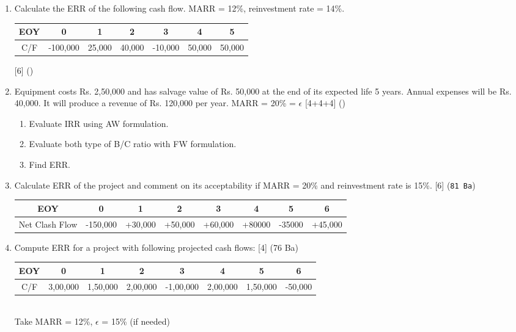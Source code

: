 \documentclass[12pt]{article}
\begin{document}
\begin{enumerate}[topsep = 0pt]
				\item Calculate the ERR of the following cash flow. MARR = 12\%, reinvestment rate = 14\%.\\
				\begin{tabular}{|c|c|c|c|c|c|c|}
					\hline
					EOY & 0 & 1 & 2 & 3 & 4 & 5\\ \hline
					C/F & -100,000 & 25,000 & 40,000 & -10,000 & 50,000 & 50,000 \\ \hline
				\end{tabular} \hfill [6] ()
				
				\item Equipment costs Rs. 2,50,000 and has salvage value of Rs. 50,000 at the end of its expected life 5 years. Annual expenses will be Rs. 40,000. It will produce a revenue of Rs. 120,000 per year. MARR = 20\% = $\epsilon$ \hfill [4+4+4] ()
				\begin{enumerate}[noitemsep, topsep = 0pt, label = \alph*.]
					\item Evaluate IRR using AW formulation.
					\item Evaluate both type of B/C ratio with FW formulation.
					\item Find ERR.
				\end{enumerate}

				\item Calculate ERR of the project and comment on its acceptability if MARR = 20\% and reinvestment rate is 15\%. \hfill [6] (\texttt{81 Ba})
				\begin{tabular}{|c|c|c|c|c|c|c|c|}
					\hline
					EOY & 0 & 1 & 2 & 3 & 4 & 5 & 6\\ \hline
					Net Clash Flow & -150,000 & +30,000 & +50,000 & +60,000 & +80000 & -35000 & +45,000\\ 
					\hline
				\end{tabular}
				
				\item Compute ERR for a project with following projected cash flows: \hfill [4] (76 Ba)
				\begin{tabular}{|c|c|c|c|c|c|c|c|}
					\hline
					EOY & 0 & 1 & 2 & 3 & 4 & 5 & 6\\ \hline
					C/F & 3,00,000 & 1,50,000 & 2,00,000 & -1,00,000 & 2,00,000 & 1,50,000 & -50,000\\ 
					\hline
				\end{tabular}\\
				Take MARR = 12\%, $\epsilon$ = 15\% (if needed)
			\end{enumerate}
\end{document}
